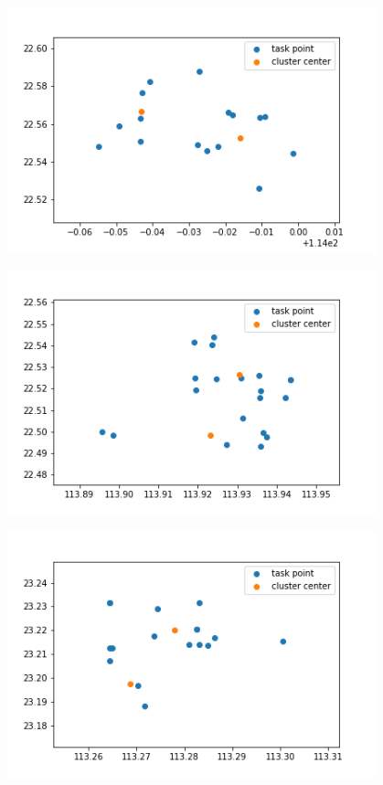 \begin{figure}
    \centering
    \begin{minipage}[c]{0.3\textwidth}
        \centering
        \includegraphics[width=0.95\textwidth]{24.png}
        \label{fig:sample-figure-a}
    \end{minipage}
    \begin{minipage}[c]{0.3\textwidth}
        \centering
        \includegraphics[width=0.95\textwidth]{25.png}
        \label{fig:sample-figure-b}
    \end{minipage}
    \begin{minipage}[c]{0.3\textwidth}
        \centering
        \includegraphics[width=0.95\textwidth]{83.png}

\end{minipage}
\end{figure}
